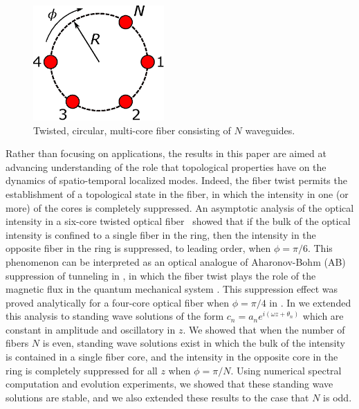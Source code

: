 \documentclass[11pt,reqno]{amsart}
\begin{document}
\begin{figure}
\begin{center}
\includegraphics[width=5cm]{circle}
\end{center}
\caption{Twisted, circular, multi-core fiber consisting of $N$ waveguides.}
\label{fig:circle}
\end{figure}


Rather than focusing on applications, the results in this paper are aimed at advancing  understanding of the role that topological properties have on the dynamics of spatio-temporal localized modes. 
 Indeed, the fiber twist permits the establishment of a topological state in the fiber, in which the intensity in one (or more) of the cores is completely suppressed. An asymptotic analysis of the optical intensity in a  six-core twisted optical fiber~\cite{castro2016} showed that if the bulk of the optical intensity is confined to a single fiber in the ring, then the intensity in the opposite fiber in the ring is suppressed, to leading order, when $\phi = \pi/6$. This phenomenon can be interpreted as an optical analogue of Aharonov-Bohm (AB) suppression of tunneling in \cite{Ornigotti2007,Parto2017,Parto2019}, in which the fiber twist plays the role of the magnetic flux in the quantum mechanical system \cite{Loss1992}. This suppression effect was proved analytically for a four-core optical fiber when $\phi=\pi/4$ in \cite{Parto2019}. In \cite{parker2021} we extended this analysis to standing wave solutions of the form $c_n = a_n e^{i (\omega z + \theta_n) }$ which are constant in amplitude and oscillatory in $z$. We showed that when the number of fibers $N$ is even, standing wave solutions exist in which the bulk of the intensity is contained in a single fiber core, and the intensity in the opposite core in the ring is completely suppressed for all $z$ when $\phi = \pi/N$. Using numerical spectral computation and evolution experiments, we showed that these standing wave solutions are stable, and we also extended these results to the case that $N$ is odd.
\end{document}

